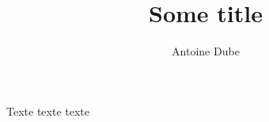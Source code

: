 \documentclass{article}
\begin{document}
\title{Some title}

\author{Antoine Dube}

Texte texte texte
\end{document}
